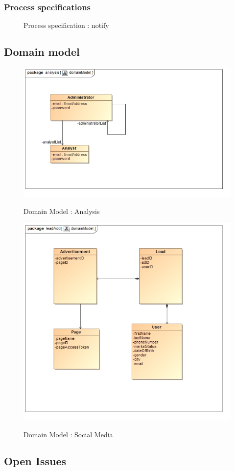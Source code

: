 \documentclass{article}
\begin{document}
		\subsubsection{Process specifications}

		\begin{figure}[H]
		\caption{Process specification : notify}
		\end{figure}


\subsection{Domain model}

\begin{figure}[H]
\includegraphics[width=\textwidth]{images/class__analysis__domainModel.jpg}  \\
\caption{Domain Model : Analysis}
\end{figure}

\begin{figure}[H]
\includegraphics[width=\textwidth]{images/class__leadAdd__domainModel.jpg}  \\
\caption{Domain Model : Social Media}
\end{figure}

\subsection{Open Issues}
\end{document}
